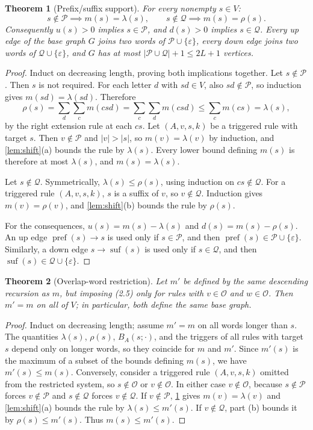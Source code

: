 \documentclass[11pt]{article}
\numberwithin{equation}{section}
\newtheorem{theorem}{Theorem}[section]
\theoremstyle{definition}
\newcommand{\pref}{\operatorname{pref}}
\newcommand{\suf}{\operatorname{suf}}
\newcommand{\len}[1]{\lvert #1\rvert}
\newcommand{\eps}{\varepsilon}
\newcommand{\Pre}{\mathcal P}
\newcommand{\Suf}{\mathcal Q}
\newcommand{\Ov}{\mathcal O}
\begin{document}
\begin{theorem}[Prefix/suffix support]\label{thm:support}
For every nonempty $s\in V$:
\[
s\notin\Pre\implies m(s)=\lambda(s),\qquad
s\notin\Suf\implies m(s)=\rho(s).
\]
Consequently $u(s)>0$ implies $s\in\Pre$, and $d(s)>0$ implies
$s\in\Suf$. Every up edge of the base graph $G$ joins two words of
$\Pre\cup\{\eps\}$, every down edge joins two words of
$\Suf\cup\{\eps\}$, and $G$ has at most $\len{\Pre\cup\Suf}+1\le2L+1$
vertices.
\end{theorem}

\begin{proof}
Induct on decreasing length, proving both implications together. Let
$s\notin\Pre$. Then $s$ is not required. For each letter $d$ with $sd\in V$,
also $sd\notin\Pre$, so induction gives $m(sd)=\lambda(sd)$. Therefore
\[
\rho(s)=\sum_d\sum_c m(csd)=\sum_c\sum_d m(csd)\le\sum_c m(cs)=\lambda(s),
\]
by the right extension rule at each $cs$. Let $(A,v,s,k)$ be a triggered rule
with target $s$. Then $v\notin\Pre$ and $\len v>\len s$, so $m(v)=\lambda(v)$
by induction, and \cref{lem:shift}(a) bounds the rule by $\lambda(s)$. Every
lower bound defining $m(s)$ is therefore at most $\lambda(s)$, and
$m(s)=\lambda(s)$.

Let $s\notin\Suf$. Symmetrically, $\lambda(s)\le\rho(s)$, using induction on
$cs\notin\Suf$. For a triggered rule $(A,v,s,k)$, $s$ is a suffix of $v$, so
$v\notin\Suf$. Induction gives $m(v)=\rho(v)$, and \cref{lem:shift}(b)
bounds the rule by $\rho(s)$.

For the consequences, $u(s)=m(s)-\lambda(s)$ and $d(s)=m(s)-\rho(s)$. An up
edge $\pref(s)\to s$ is used only if $s\in\Pre$, and then
$\pref(s)\in\Pre\cup\{\eps\}$. Similarly, a down edge $s\to\suf(s)$ is used only
if $s\in\Suf$, and then $\suf(s)\in\Suf\cup\{\eps\}$.
\end{proof}

\begin{theorem}[Overlap-word restriction]\label{thm:restrict}
Let $m'$ be defined by the same descending recursion as $m$, but imposing
(2.5) only for rules with $v\in\Ov$ and $w\in\Ov$. Then $m'=m$ on all of $V$;
in particular, both define the same base graph.
\end{theorem}

\begin{proof}
Induct on decreasing length; assume $m'=m$ on all words longer than $s$.
The quantities $\lambda(s)$, $\rho(s)$, $B_A(s;\cdot)$, and the triggers of
all rules with target $s$ depend only on longer words, so they coincide for
$m$ and $m'$. Since $m'(s)$ is the maximum of a subset of the bounds defining
$m(s)$, we have $m'(s)\le m(s)$. Conversely, consider a triggered rule
$(A,v,s,k)$ omitted from the restricted system, so $s\notin\Ov$ or
$v\notin\Ov$. In either case $v\notin\Ov$, because $s\notin\Pre$ forces
$v\notin\Pre$ and $s\notin\Suf$ forces $v\notin\Suf$. If $v\notin\Pre$, \cref{thm:support} gives $m(v)=\lambda(v)$ and
\cref{lem:shift}(a) bounds the rule by $\lambda(s)\le m'(s)$. If
$v\notin\Suf$, part (b) bounds it by $\rho(s)\le m'(s)$. Thus
$m(s)\le m'(s)$.
\end{proof}
\end{document}
